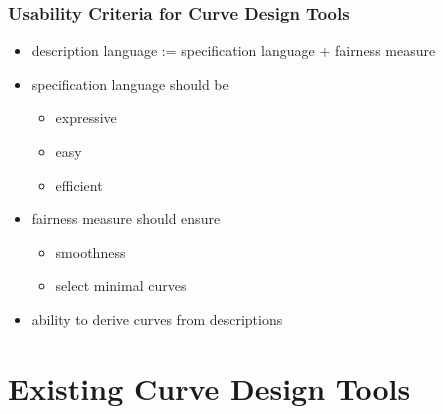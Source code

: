 \documentclass{beamer}
\begin{document}
		\begin{frame}
			\frametitle{Usability Criteria for Curve Design Tools}
			\begin{itemize}
				\item description language := specification language + fairness measure
				\item specification language should be
				\begin{itemize}
					\item expressive
					\item easy
					\item efficient
				\end{itemize}
				\item fairness measure should ensure
				\begin{itemize}
					\item smoothness
					\item select minimal curves
				\end{itemize}
				\item ability to derive curves from descriptions
			\end{itemize}
		\end{frame}
		
	\section{Existing Curve Design Tools}
	
\end{document}

